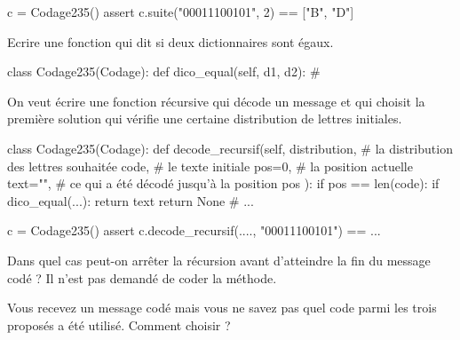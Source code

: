 \begin{xexercice}
\begin{verbatimx}
c = Codage235()
assert c.suite("00011100101", 2) == ["B", "D"]
\end{verbatimx}

\exequest Ecrire une fonction qui dit si deux dictionnaires sont égaux.

\begin{verbatimx}
class Codage235(Codage):
    def dico_equal(self, d1, d2):
      # 
\end{verbatimx}
    

\exequest On veut écrire une fonction récursive qui décode un message et
qui choisit la première solution qui vérifie
une certaine distribution de lettres initiales. 

\begin{verbatimx}
class Codage235(Codage):
    def decode_recursif(self,
            distribution,   # la distribution des lettres souhaitée
            code,           # le texte initiale
            pos=0,          # la position actuelle
            text="",        # ce qui a été décodé jusqu'à la position pos
            ):
        if pos == len(code):
            if dico_equal(...):
                return text
            return None
        # ...

c = Codage235()
assert c.decode_recursif({....}, "00011100101") == ...
\end{verbatimx}

\exequest Dans quel cas peut-on arrêter la récursion avant d'atteindre la fin du message codé ?
Il n'est pas demandé de coder la méthode.

\exequest Vous recevez un message codé mais vous ne savez pas quel code parmi les trois proposés
a été utilisé. Comment choisir ?

\end{xexercice}






%
